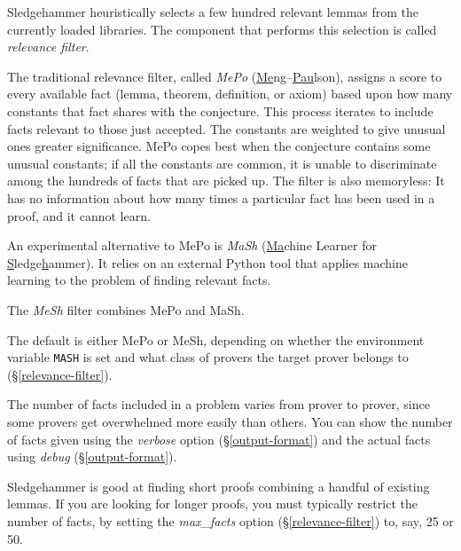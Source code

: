 \documentclass[a4paper,12pt]{article}
\begin{document}

Sledgehammer heuristically selects a few hundred relevant lemmas from the
currently loaded libraries. The component that performs this selection is
called \emph{relevance filter}.

\begin{enum}
\item[\labelitemi]
The traditional relevance filter, called \emph{MePo}
(\underline{Me}ng--\underline{Pau}lson), assigns a score to every available fact
(lemma, theorem, definition, or axiom) based upon how many constants that fact
shares with the conjecture. This process iterates to include facts relevant to
those just accepted. The constants are weighted to give unusual ones greater
significance. MePo copes best when the conjecture contains some unusual
constants; if all the constants are common, it is unable to discriminate among
the hundreds of facts that are picked up. The filter is also memoryless: It has
no information about how many times a particular fact has been used in a proof,
and it cannot learn.

\item[\labelitemi]
An experimental alternative to MePo is \emph{MaSh}
(\underline{Ma}chine Learner for \underline{S}ledge\underline{h}ammer). It
relies on an external Python tool that applies machine learning to
the problem of finding relevant facts.

\item[\labelitemi] The \emph{MeSh} filter combines MePo and MaSh.
\end{enum}

The default is either MePo or MeSh, depending on whether the environment
variable \texttt{MASH} is set and what class of provers the target prover
belongs to (\S\ref{relevance-filter}).

The number of facts included in a problem varies from prover to prover, since
some provers get overwhelmed more easily than others. You can show the number of
facts given using the \textit{verbose} option (\S\ref{output-format}) and the
actual facts using \textit{debug} (\S\ref{output-format}).

Sledgehammer is good at finding short proofs combining a handful of existing
lemmas. If you are looking for longer proofs, you must typically restrict the
number of facts, by setting the \textit{max\_facts} option
(\S\ref{relevance-filter}) to, say, 25 or 50.
\end{document}
